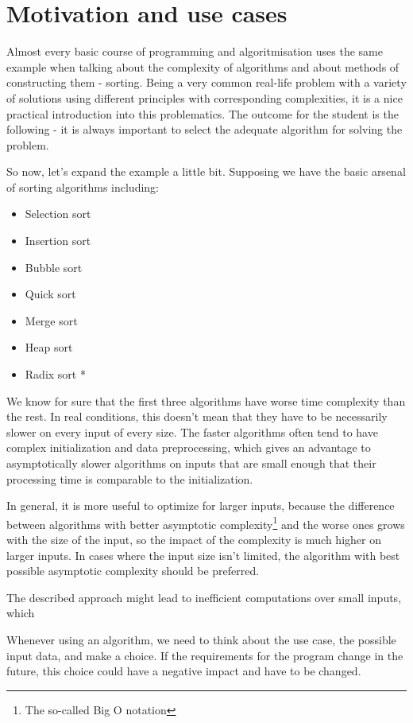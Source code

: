 \chapter{Motivation and use cases}

Almost every basic course of programming and algoritmisation uses the same example when talking about the complexity of algorithms and about methods of constructing them - sorting. Being a very common real-life problem with a variety of solutions using different principles with corresponding complexities, it is a nice practical introduction into this problematics. The outcome for the student is the following - it is always important to select the adequate algorithm for solving the problem.

So now, let's expand the example a little bit. Supposing we have the basic arsenal of sorting algorithms including:

\begin{itemize}
	\item Selection sort
	\item Insertion sort
	\item Bubble sort
	\item Quick sort
	\item Merge sort
	\item Heap sort
	\item Radix sort *	
\end{itemize}

We know for sure that the first three algorithms have worse time complexity than the rest. In real conditions, this doesn't mean that they have to be necessarily slower on every input of every size. The faster algorithms often tend to have complex initialization and data preprocessing, which gives an advantage to asymptotically slower algorithms on inputs that are small enough that their processing time is comparable to the initialization. 

In general, it is more useful to optimize for larger inputs, because the difference between algorithms with better asymptotic complexity\footnote{The so-called Big O notation} and the worse ones grows with the size of the input, so the impact of the complexity is much higher on larger inputs. In cases where the input size isn't limited, the algorithm with best possible asymptotic complexity should be preferred.

The described approach might lead to inefficient computations over small inputs, which 

Whenever using an algorithm, we need to think about the use case, the possible input data, and make a choice. If the requirements for the program change in the future, this choice could have a negative impact and have to be changed.

